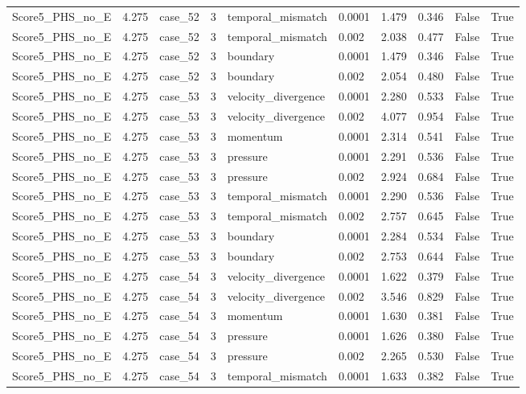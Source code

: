 \begin{longtable}{llllllllll}
Score5\_PHS\_no\_E & 4.275 & case\_52 & 3 & temporal\_mismatch & 0.0001 & 1.479 & 0.346 & False & True \\
Score5\_PHS\_no\_E & 4.275 & case\_52 & 3 & temporal\_mismatch & 0.002 & 2.038 & 0.477 & False & True \\
Score5\_PHS\_no\_E & 4.275 & case\_52 & 3 & boundary & 0.0001 & 1.479 & 0.346 & False & True \\
Score5\_PHS\_no\_E & 4.275 & case\_52 & 3 & boundary & 0.002 & 2.054 & 0.480 & False & True \\
Score5\_PHS\_no\_E & 4.275 & case\_53 & 3 & velocity\_divergence & 0.0001 & 2.280 & 0.533 & False & True \\
Score5\_PHS\_no\_E & 4.275 & case\_53 & 3 & velocity\_divergence & 0.002 & 4.077 & 0.954 & False & True \\
Score5\_PHS\_no\_E & 4.275 & case\_53 & 3 & momentum & 0.0001 & 2.314 & 0.541 & False & True \\
Score5\_PHS\_no\_E & 4.275 & case\_53 & 3 & pressure & 0.0001 & 2.291 & 0.536 & False & True \\
Score5\_PHS\_no\_E & 4.275 & case\_53 & 3 & pressure & 0.002 & 2.924 & 0.684 & False & True \\
Score5\_PHS\_no\_E & 4.275 & case\_53 & 3 & temporal\_mismatch & 0.0001 & 2.290 & 0.536 & False & True \\
Score5\_PHS\_no\_E & 4.275 & case\_53 & 3 & temporal\_mismatch & 0.002 & 2.757 & 0.645 & False & True \\
Score5\_PHS\_no\_E & 4.275 & case\_53 & 3 & boundary & 0.0001 & 2.284 & 0.534 & False & True \\
Score5\_PHS\_no\_E & 4.275 & case\_53 & 3 & boundary & 0.002 & 2.753 & 0.644 & False & True \\
Score5\_PHS\_no\_E & 4.275 & case\_54 & 3 & velocity\_divergence & 0.0001 & 1.622 & 0.379 & False & True \\
Score5\_PHS\_no\_E & 4.275 & case\_54 & 3 & velocity\_divergence & 0.002 & 3.546 & 0.829 & False & True \\
Score5\_PHS\_no\_E & 4.275 & case\_54 & 3 & momentum & 0.0001 & 1.630 & 0.381 & False & True \\
Score5\_PHS\_no\_E & 4.275 & case\_54 & 3 & pressure & 0.0001 & 1.626 & 0.380 & False & True \\
Score5\_PHS\_no\_E & 4.275 & case\_54 & 3 & pressure & 0.002 & 2.265 & 0.530 & False & True \\
Score5\_PHS\_no\_E & 4.275 & case\_54 & 3 & temporal\_mismatch & 0.0001 & 1.633 & 0.382 & False & True \\

\end{longtable}

